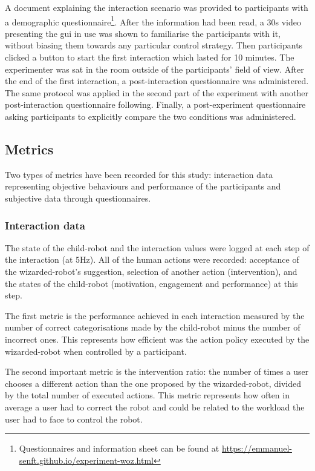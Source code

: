 A document explaining the interaction scenario was provided to participants with a demographic questionnaire\footnote{Questionnaires and information sheet can be found at \url{https://emmanuel-senft.github.io/experiment-woz.html}}. After the information had been read, a 30s video presenting the \gls{gui} in use was shown to familiarise the participants with it, without biasing them towards any particular control strategy. Then participants clicked a button to start the first interaction which lasted for 10 minutes. The experimenter was sat in the room outside of the participants' field of view. After the end of the first interaction, a post-interaction questionnaire was administered. The same protocol was applied in the second part of the experiment with another post-interaction questionnaire following. Finally, a post-experiment questionnaire asking participants to explicitly compare the two conditions was administered.

\subsection{Metrics}

Two types of metrics have been recorded for this study: interaction data representing objective behaviours and performance of the participants and subjective data through questionnaires.

\subsubsection{Interaction data}

The state of the child-robot and the interaction values were logged at each step of the interaction (at 5Hz). All of the human actions were recorded: acceptance of the wizarded-robot's suggestion, selection of another action (intervention), and the states of the child-robot (motivation, engagement and performance) at this step. 

The first metric is the performance achieved in each interaction measured by the number of correct categorisations made by the child-robot minus the number of incorrect ones. This represents how efficient was the action policy executed by the wizarded-robot when controlled by a participant.

The second important metric is the intervention ratio: the number of times a user chooses a different action than the one proposed by the wizarded-robot, divided by the total number of executed actions. This metric represents how often in average a user had to correct the robot and could be related to the workload the user had to face to control the robot.

